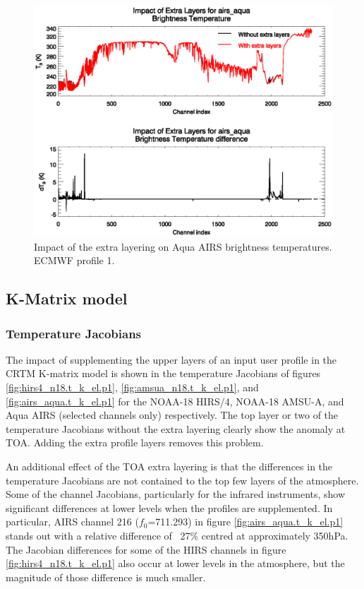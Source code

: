 \begin{figure}[htp]
  \centering
  \includegraphics[scale=0.8]{graphics/airs_aqua.fwd_el.p1.eps}
  \caption{Impact of the extra layering on Aqua AIRS brightness temperatures. ECMWF profile 1.}
  \label{fig:airs_aqua.fwd_el.p1}
\end{figure}


\subsection{K-Matrix model}

\subsubsection{Temperature Jacobians}
The impact of supplementing the upper layers of an input user profile in the CRTM K-matrix model is shown in the temperature Jacobians of figures \ref{fig:hirs4_n18.t_k_el.p1}, \ref{fig:amsua_n18.t_k_el.p1}, and \ref{fig:airs_aqua.t_k_el.p1} for the NOAA-18 HIRS/4, NOAA-18 AMSU-A, and Aqua AIRS (selected channels only) respectively. The top layer or two of the temperature Jacobians without the extra layering clearly show the anomaly at TOA. Adding the extra profile layers removes this problem.

An additional effect of the TOA extra layering is that the differences in the temperature Jacobians are not contained to the top few layers of the atmosphere. Some of the channel Jacobians, particularly for the infrared instruments, show significant differences at lower levels when the profiles are supplemented. In particular, AIRS channel 216 ($f_{0}$=711.293\invcm) in figure \ref{fig:airs_aqua.t_k_el.p1} stands out with a relative difference of ~27\% centred at approximately 350hPa. The Jacobian differences for some of the HIRS channels in figure \ref{fig:hirs4_n18.t_k_el.p1} also occur at lower levels in the atmosphere, but the magnitude of those difference is much smaller.

